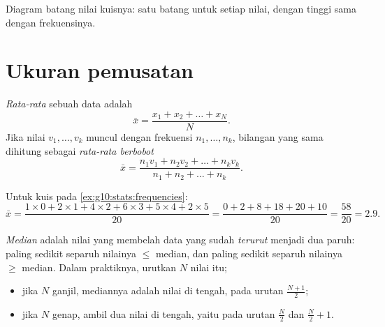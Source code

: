 \begin{omfigure}

{\small Diagram batang nilai kuisnya: satu batang untuk setiap nilai, dengan
tinggi sama dengan frekuensinya.}
\end{omfigure}

\section{Ukuran pemusatan}

\begin{definition}\label{def:g10:stats:mean}
\emph{Rata-rata} sebuah data adalah
\[
\bar x = \frac{x_1 + x_2 + \dots + x_N}{N}.
\]
Jika nilai $v_1, \dots, v_k$ muncul dengan frekuensi $n_1, \dots, n_k$,
bilangan yang sama dihitung sebagai \emph{rata-rata berbobot}
\[
\bar x = \frac{n_1 v_1 + n_2 v_2 + \dots + n_k v_k}{n_1 + n_2 + \dots + n_k}.
\]
\end{definition}

\begin{example}\label{ex:g10:stats:mean}
Untuk kuis pada \cref{ex:g10:stats:frequencies}:
\[
\bar x = \frac{1 \times 0 + 2 \times 1 + 4 \times 2 + 6 \times 3
+ 5 \times 4 + 2 \times 5}{20}
= \frac{0 + 2 + 8 + 18 + 20 + 10}{20}
= \frac{58}{20} = 2.9 .
\]
\end{example}

\begin{definition}[Median]\label{def:g10:stats:median}
\emph{Median} adalah nilai yang membelah data yang sudah
\emph{terurut} menjadi dua paruh: paling sedikit separuh nilainya $\leq$
median, dan paling sedikit separuh nilainya $\geq$ median. Dalam praktiknya,
urutkan $N$ nilai itu;
\begin{itemize}
  \item jika $N$ ganjil, mediannya adalah nilai di tengah, pada urutan
        $\frac{N+1}{2}$;
  \item jika $N$ genap, ambil  dua nilai di tengah, yaitu pada
        urutan $\frac N2$ dan $\frac N2 + 1$.
\end{itemize}
\end{definition}

